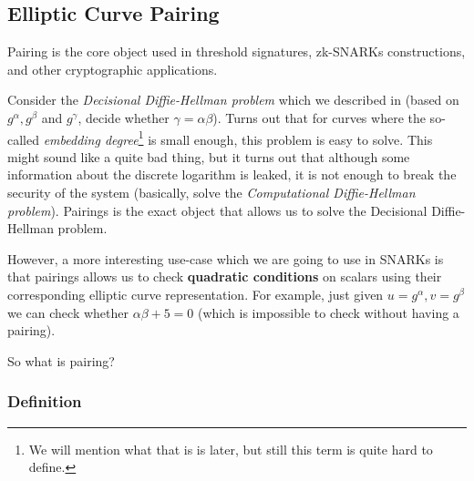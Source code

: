 \documentclass[../lecture-notes.tex]{subfiles}
\begin{document}
\subsection{Elliptic Curve Pairing}

Pairing is the core object used in threshold signatures, zk-SNARKs constructions, and other cryptographic applications. 

Consider the \textit{Decisional Diffie-Hellman problem} which we described in  (based on $g^{\alpha},g^{\beta}$ and $g^{\gamma}$, decide whether $\gamma = \alpha\beta$). Turns out that for curves where the so-called \textit{embedding degree}\footnote{We will mention what that is is later, but still this term is quite hard to define.} is small enough, this problem is easy to solve. This might sound 
like a quite bad thing, but it turns out that although some information about the discrete logarithm is leaked, it is not enough to break the security of the system (basically, solve the \textit{Computational Diffie-Hellman problem}). 
Pairings is the exact object that allows us to solve the Decisional Diffie-Hellman problem.

However, a more interesting use-case which we are going to use in SNARKs is that pairings allows us to check \textbf{quadratic conditions} on scalars using their corresponding elliptic curve representation. For example, just given $u=g^{\alpha},v=g^{\beta}$ we can check whether $\alpha\beta+5=0$ (which is impossible to check without having a pairing). 

So what is pairing?

\subsubsection{Definition}
\end{document}
